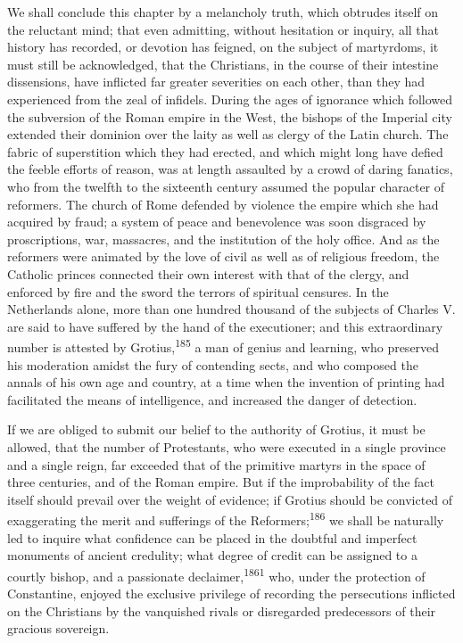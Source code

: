 We shall conclude this chapter by a melancholy truth, which
obtrudes itself on the reluctant mind; that even admitting,
without hesitation or inquiry, all that history has recorded, or
devotion has feigned, on the subject of martyrdoms, it must still
be acknowledged, that the Christians, in the course of their
intestine dissensions, have inflicted far greater severities on
each other, than they had experienced from the zeal of infidels.
During the ages of ignorance which followed the subversion of the
Roman empire in the West, the bishops of the Imperial city
extended their dominion over the laity as well as clergy of the
Latin church. The fabric of superstition which they had erected,
and which might long have defied the feeble efforts of reason,
was at length assaulted by a crowd of daring fanatics, who from
the twelfth to the sixteenth century assumed the popular
character of reformers. The church of Rome defended by violence
the empire which she had acquired by fraud; a system of peace and
benevolence was soon disgraced by proscriptions, war, massacres,
and the institution of the holy office. And as the reformers were
animated by the love of civil as well as of religious freedom,
the Catholic princes connected their own interest with that of
the clergy, and enforced by fire and the sword the terrors of
spiritual censures. In the Netherlands alone, more than one
hundred thousand of the subjects of Charles V. are said to have
suffered by the hand of the executioner; and this extraordinary
number is attested by Grotius,\textsuperscript{185} a man of genius and learning,
who preserved his moderation amidst the fury of contending sects,
and who composed the annals of his own age and country, at a time
when the invention of printing had facilitated the means of
intelligence, and increased the danger of detection.

If we are obliged to submit our belief to the authority of
Grotius, it must be allowed, that the number of Protestants, who
were executed in a single province and a single reign, far
exceeded that of the primitive martyrs in the space of three
centuries, and of the Roman empire. But if the improbability of
the fact itself should prevail over the weight of evidence; if
Grotius should be convicted of exaggerating the merit and
sufferings of the Reformers;\textsuperscript{186} we shall be naturally led to
inquire what confidence can be placed in the doubtful and
imperfect monuments of ancient credulity; what degree of credit
can be assigned to a courtly bishop, and a passionate declaimer,\textsuperscript{1861}
who, under the protection of Constantine, enjoyed the
exclusive privilege of recording the persecutions inflicted on
the Christians by the vanquished rivals or disregarded
predecessors of their gracious sovereign.

